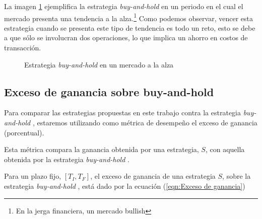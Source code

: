 \documentclass[12pt]{scrbook}
\theoremstyle{break}
\theoremstyle{break}
\newcommand{\buyhold}{\textit{buy-and-hold} }
\begin{document}
La imagen \ref{imagen:buy hold alza} ejemplifica la estrategia \buyhold en un periodo en el cual el mercado presenta una tendencia a la alza.\footnote{En la jerga financiera, un mercado bullish} Como podemos observar, vencer esta estrategia cuando se presenta este tipo de tendencia es todo un reto, esto se debe a que sólo se involucran dos operaciones, lo que implica un ahorro en costos de transacción.

\begin{figure}[ht]
\centering
{}
\caption{\label{imagen:buy hold alza} Estrategia \buyhold en un mercado a la alza}
\end{figure}

\subsection{Exceso de ganancia sobre buy-and-hold}
\label{subseccion:exceso de ganancia}

Para comparar las estrategias propuestas en este trabajo contra la estrategia \buyhold, estaremos utilizando como métrica de desempeño el exceso de ganancia (porcentual).

Esta métrica compara la ganancia obtenida por una estrategia, $S$, con aquella obtenida por la estrategia \buyhold.

Para un plazo fijo, $\left[T_{I}, T_{F}\right]$, el exceso de ganancia de una estrategia $S$, sobre la estrategia \buyhold, está dado por la ecuación (\ref{eqn:Exceso de ganancia})
\end{document}
